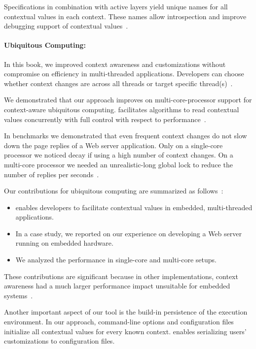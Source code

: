 Specifications in combination with active layers yield unique names for all contextual values in each context.
These names allow introspection and improve debugging support of contextual values~\cite{raab2014program}.


\paragraph{Ubiquitous Computing:}

In this book, we improved context awareness and customizations without compromise on efficiency in multi-threaded applications.
Developers can choose whether context changes are across all threads or target specific thread(s)~\cite{raab2015global}.

We demonstrated that our approach improves on multi-core-processor support for context-aware ubiquitous computing.
\elektra{} facilitates algorithms to read contextual values concurrently with full control with respect to performance~\cite{raab2015global}.

In benchmarks we demonstrated that even frequent context changes do not slow down the page replies of a Web server application.
Only on a single-core processor we noticed decay if using a high number of context changes.
On a multi-core processor we needed an unrealistic-long global lock to reduce the number of replies per seconds~\cite{raab2015global}.

Our contributions for ubiquitous computing are summarized as follows~\cite{raab2015global}:
\begin{itemize}
\item \elektra{} enables developers to facilitate contextual values in embedded, multi-threaded applications.
\item In a case study, we reported on our experience on developing a Web server running on embedded hardware.
\item We analyzed the performance in single-core and multi-core setups.
\end{itemize}


These contributions are significant because in other implementations, context awareness had a much larger performance impact unsuitable for embedded systems~\cite{raab2015global}.


Another important aspect of our tool is the build-in persistence of the execution environment.
In our approach, command-line options and configuration files initialize all contextual values for every known context.
\elektra{} enables serializing users' customizations to configuration files.


